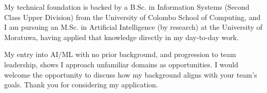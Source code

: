 \documentclass[11pt]{article}
\begin{document}
My technical foundation is backed by a B.Sc. in Information Systems (Second Class Upper Division) from the University of Colombo School of Computing, and I am pursuing an M.Sc. in Artificial Intelligence (by research) at the University of Moratuwa, having applied that knowledge directly in my day-to-day work.

My entry into AI/ML with no prior background, and progression to team leadership, shows I approach unfamiliar domains as opportunities. I would welcome the opportunity to discuss how my background aligns with your team's goals. Thank you for considering my application.

\end{document}
